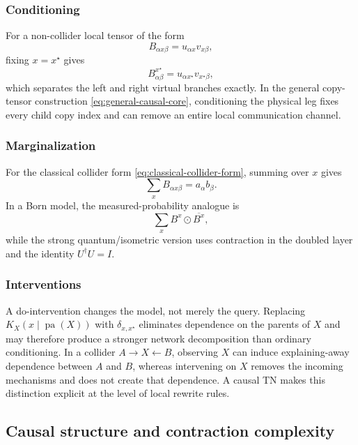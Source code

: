 \documentclass[11pt]{article}
\theoremstyle{remark}
\newcommand{\pa}{\operatorname{pa}}
\newcommand{\odotc}{\mathbin{\odot}}
\begin{document}
\subsubsection{Conditioning}

For a non-collider local tensor of the form
\begin{equation}
B_{\alpha x\beta}=u_{\alpha x}v_{x\beta},
\end{equation}
fixing $x=x^\star$ gives
\begin{equation}
B^{x^\star}_{\alpha\beta}=u_{\alpha x^\star}v_{x^\star\beta},
\end{equation}
which separates the left and right virtual branches exactly. In the general copy-tensor construction \eqref{eq:general-causal-core}, conditioning the physical leg fixes every child copy index and can remove an entire local communication channel.

\subsubsection{Marginalization}

For the classical collider form \eqref{eq:classical-collider-form}, summing over $x$ gives
\begin{equation}
\sum_x B_{\alpha x\beta}=a_\alpha b_\beta.
\end{equation}
In a Born model, the measured-probability analogue is
\begin{equation}
\sum_x B^x\odotc\overline{B^x},
\end{equation}
while the strong quantum/isometric version uses contraction in the doubled layer and the identity $U^\dagger U=I$.

\subsubsection{Interventions}

A do-intervention changes the model, not merely the query. Replacing $K_X(x\mid\pa(X))$ with $\delta_{x,x^\star}$ eliminates dependence on the parents of $X$ and may therefore produce a stronger network decomposition than ordinary conditioning. In a collider $A\to X\leftarrow B$, observing $X$ can induce explaining-away dependence between $A$ and $B$, whereas intervening on $X$ removes the incoming mechanisms and does not create that dependence. A causal TN makes this distinction explicit at the level of local rewrite rules.

\subsection{Causal structure and contraction complexity}
\label{sec:synthesis-contraction}
\end{document}
